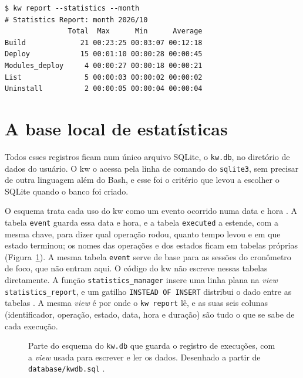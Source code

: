 \begin{program}[htbp]
  \centering
\begin{lstlisting}[style=wider, language={}, style=nocolor, numbers=none]
$ kw report --statistics --month
# Statistics Report: month 2026/10
               Total  Max      Min      Average
Build             21 00:23:25 00:03:07 00:12:18
Deploy            15 00:01:10 00:00:28 00:00:45
Modules_deploy     4 00:00:27 00:00:18 00:00:21
List               5 00:00:03 00:00:02 00:00:02
Uninstall          2 00:00:05 00:00:04 00:00:04
\end{lstlisting}
  \caption{Exemplo de saída do \texttt{kw report}. O formato é o do kw; os
    valores são ilustrativos.}
  \label{prog:report}
\end{program}

\section{A base local de estatísticas}
\label{sec:base-local}

Todos esses registros ficam num único arquivo SQLite, o \texttt{kw.db}, no
diretório de dados do usuário. O kw o acessa pela linha de comando do
\texttt{sqlite3}, sem precisar de outra linguagem além do Bash, e esse foi o
critério que levou \citet{neto2022kw} a escolher o SQLite quando o banco foi
criado.

O esquema trata cada uso do kw como um evento ocorrido numa data e
hora \citep{neto2022kw}. A tabela \texttt{event} guarda essa data e hora, e a
tabela \texttt{executed} a estende, com a mesma chave, para dizer qual
operação rodou, quanto tempo levou e em que estado terminou; os nomes das
operações e dos estados ficam em tabelas próprias
(Figura~\ref{fig:esquema-kw}). A mesma tabela \texttt{event} serve de base
para as sessões do cronômetro de foco, que não entram aqui. O código do kw
não escreve nessas tabelas diretamente. A função \texttt{statistics\_manager}
insere uma linha plana na \textit{view} \texttt{statistics\_report}, e um
gatilho \texttt{INSTEAD OF INSERT} distribui o dado entre as tabelas
\citep{kworkflowrepo}. A mesma \textit{view} é por onde o \texttt{kw report}
lê, e as suas seis colunas (identificador, operação, estado, data, hora e
duração) são tudo o que se sabe de cada execução.

\begin{figure}[htbp]
  \centering
  \resizebox{\textwidth}{!}{}
  \caption{Parte do esquema do \texttt{kw.db} que guarda o registro de
    execuções, com a \textit{view} usada para escrever e ler os dados.
    Desenhado a partir de \texttt{database/kwdb.sql} \citep{kworkflowrepo}.}
  \label{fig:esquema-kw}
\end{figure}

